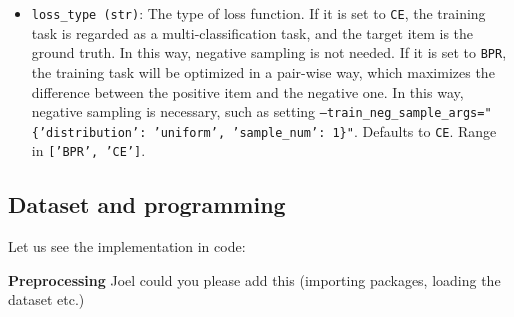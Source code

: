 \documentclass{article}
\begin{document}
\begin{itemize}
    \item \texttt{loss\_type (str)}: The type of loss function. If it is set to \texttt{CE}, the training task is regarded as a multi-classification task, and the target item is the ground truth. In this way, negative sampling is not needed. If it is set to \texttt{BPR}, the training task will be optimized in a pair-wise way, which maximizes the difference between the positive item and the negative one. In this way, negative sampling is necessary, such as setting \texttt{--train\_neg\_sample\_args="\{'distribution': 'uniform', 'sample\_num': 1\}"}. Defaults to \texttt{CE}. Range in \texttt{['BPR', 'CE']}.
\end{itemize}

\subsection{Dataset and programming}

Let us see the implementation in code:

\textbf{Preprocessing} Joel could you please add this (importing packages, loading the dataset etc.)
\end{document}
